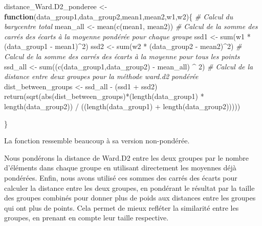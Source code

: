 \documentclass[
]{article}
\newenvironment{Shaded}{\begin{snugshade}}{\end{snugshade}}
\newcommand{\CommentTok}[1]{\textcolor[rgb]{0.56,0.35,0.01}{\textit{#1}}}
\newcommand{\ControlFlowTok}[1]{\textcolor[rgb]{0.13,0.29,0.53}{\textbf{#1}}}
\newcommand{\DecValTok}[1]{\textcolor[rgb]{0.00,0.00,0.81}{#1}}
\newcommand{\FunctionTok}[1]{\textcolor[rgb]{0.00,0.00,0.00}{#1}}
\newcommand{\NormalTok}[1]{#1}
\newcommand{\OtherTok}[1]{\textcolor[rgb]{0.56,0.35,0.01}{#1}}
\newcommand{\SpecialCharTok}[1]{\textcolor[rgb]{0.00,0.00,0.00}{#1}}
\begin{document}
\begin{Shaded}
\begin{Highlighting}[]
\NormalTok{distance\_Ward.D2\_ponderee }\OtherTok{\textless{}{-}} \ControlFlowTok{function}\NormalTok{(data\_group1,data\_group2,mean1,mean2,w1,w2)\{}
  \CommentTok{\# Calcul du barycentre total}
\NormalTok{  mean\_all }\OtherTok{\textless{}{-}} \FunctionTok{mean}\NormalTok{(}\FunctionTok{c}\NormalTok{(mean1, mean2))}
  \CommentTok{\# Calcul de la somme des carrés des écarts à la moyenne pondérée pour chaque groupe}
\NormalTok{  ssd1 }\OtherTok{\textless{}{-}} \FunctionTok{sum}\NormalTok{(w1 }\SpecialCharTok{*}\NormalTok{ (data\_group1 }\SpecialCharTok{{-}}\NormalTok{ mean1)}\SpecialCharTok{\^{}}\DecValTok{2}\NormalTok{)}
\NormalTok{  ssd2 }\OtherTok{\textless{}{-}} \FunctionTok{sum}\NormalTok{(w2 }\SpecialCharTok{*}\NormalTok{ (data\_group2 }\SpecialCharTok{{-}}\NormalTok{ mean2)}\SpecialCharTok{\^{}}\DecValTok{2}\NormalTok{)}
  \CommentTok{\# Calcul de la somme des carrés des écarts à la moyenne pour tous les points}
\NormalTok{  ssd\_all }\OtherTok{\textless{}{-}} \FunctionTok{sum}\NormalTok{((}\FunctionTok{c}\NormalTok{(data\_group1,data\_group2) }\SpecialCharTok{{-}}\NormalTok{ mean\_all) }\SpecialCharTok{\^{}} \DecValTok{2}\NormalTok{)}
  \CommentTok{\# Calcul de la distance entre deux groupes pour la méthode ward.d2 pondérée}
\NormalTok{   dist\_between\_groups }\OtherTok{\textless{}{-}}\NormalTok{ ssd\_all }\SpecialCharTok{{-}}\NormalTok{ (ssd1 }\SpecialCharTok{+}\NormalTok{ ssd2)}
  \FunctionTok{return}\NormalTok{(}\FunctionTok{sqrt}\NormalTok{(}\FunctionTok{abs}\NormalTok{(dist\_between\_groups)}\SpecialCharTok{*}\NormalTok{(}\FunctionTok{length}\NormalTok{(data\_group1) }\SpecialCharTok{*} \FunctionTok{length}\NormalTok{(data\_group2)) }\SpecialCharTok{/}\NormalTok{ ((}\FunctionTok{length}\NormalTok{(data\_group1) }\SpecialCharTok{+} \FunctionTok{length}\NormalTok{(data\_group2)))))}
  
\NormalTok{\}}
\end{Highlighting}
\end{Shaded}

La fonction ressemble beaucoup à sa version non-pondérée.

Nous pondérons la distance de Ward.D2 entre les deux groupes par le
nombre d'éléments dans chaque groupe en utilisant directement les
moyennes déjà pondérées. Enfin, nous avons utilisé ces sommes des carrés
des écarts pour calculer la distance entre les deux groupes, en
pondérant le résultat par la taille des groupes combinés pour donner
plus de poids aux distances entre les groupes qui ont plus de points.
Cela permet de mieux refléter la similarité entre les groupes, en
prenant en compte leur taille respective.
\end{document}
